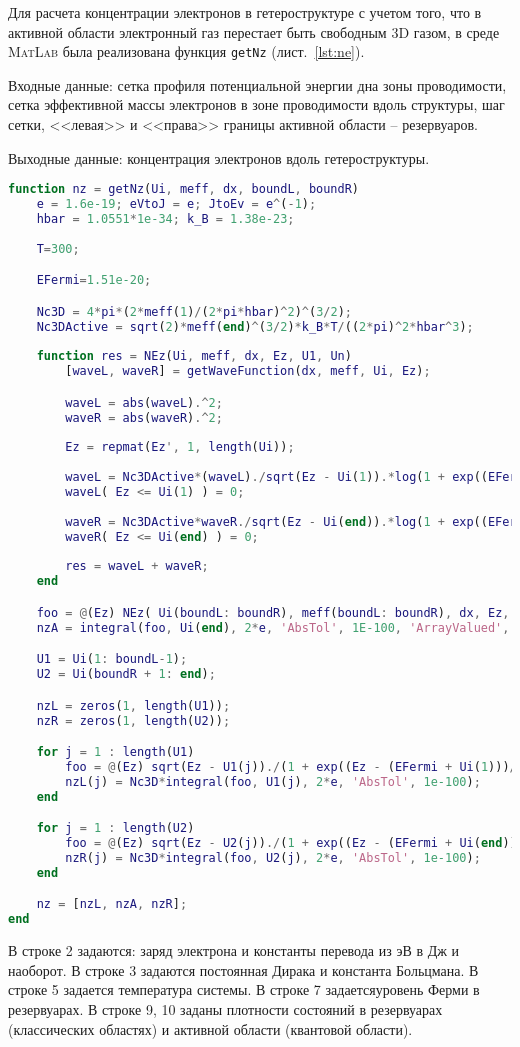 Для расчета концентрации электронов в гетероструктуре с учетом того, что в активной области электронный газ перестает быть свободным 3D газом, в среде \textsc{MatLab} была реализована функция \texttt{getNz} (лист.~\ref{lst:ne}).

Входные данные: сетка профиля потенциальной энергии дна зоны проводимости, сетка эффективной массы электронов в зоне проводимости вдоль структуры, шаг сетки, <<левая>> и <<права>> границы активной области -- резервуаров.

Выходные данные: концентрация электронов вдоль гетероструктуры.

\begin{lstlisting}[style=realcode,language=Matlab,caption={Расчет концентрации электронов в резервуарах и активной области},label={lst:ne}]
function nz = getNz(Ui, meff, dx, boundL, boundR)
	e = 1.6e-19; eVtoJ = e; JtoEv = e^(-1); 
	hbar = 1.0551*1e-34; k_B = 1.38e-23;
	
	T=300;

	EFermi=1.51e-20;

	Nc3D = 4*pi*(2*meff(1)/(2*pi*hbar)^2)^(3/2);
	Nc3DActive = sqrt(2)*meff(end)^(3/2)*k_B*T/((2*pi)^2*hbar^3);
	
	function res = NEz(Ui, meff, dx, Ez, U1, Un)
		[waveL, waveR] = getWaveFunction(dx, meff, Ui, Ez);

		waveL = abs(waveL).^2;
		waveR = abs(waveR).^2;
		
		Ez = repmat(Ez', 1, length(Ui));
		
		waveL = Nc3DActive*(waveL)./sqrt(Ez - Ui(1)).*log(1 + exp((EFermi + U1 - Ez)/(k_B*T)));
		waveL( Ez <= Ui(1) ) = 0;
		
		waveR = Nc3DActive*waveR./sqrt(Ez - Ui(end)).*log(1 + exp((EFermi + Un - Ez)/(k_B*T)));
		waveR( Ez <= Ui(end) ) = 0;
		
		res = waveL + waveR;
	end

	foo = @(Ez) NEz( Ui(boundL: boundR), meff(boundL: boundR), dx, Ez, Ui(1), Ui(end) );
	nzA = integral(foo, Ui(end), 2*e, 'AbsTol', 1E-100, 'ArrayValued', true);

	U1 = Ui(1: boundL-1);
	U2 = Ui(boundR + 1: end);

	nzL = zeros(1, length(U1));
	nzR = zeros(1, length(U2));

	for j = 1 : length(U1)
		foo = @(Ez) sqrt(Ez - U1(j))./(1 + exp((Ez - (EFermi + Ui(1)))/(k_B*T)));
		nzL(j) = Nc3D*integral(foo, U1(j), 2*e, 'AbsTol', 1e-100);
	end

	for j = 1 : length(U2)
		foo = @(Ez) sqrt(Ez - U2(j))./(1 + exp((Ez - (EFermi + Ui(end)))/(k_B*T)));
		nzR(j) = Nc3D*integral(foo, U2(j), 2*e, 'AbsTol', 1e-100);
	end

	nz = [nzL, nzA, nzR];
end
\end{lstlisting}
В строке 2 задаются: заряд электрона и константы перевода из эВ в Дж и наоборот. В строке 3 задаются постоянная Дирака и константа Больцмана. В строке 5 задается температура системы. В строке 7 задаетсяуровень Ферми в резервуарах. В строке 9, 10 заданы плотности состояний в резервуарах (классических областях) и активной области (квантовой области).

